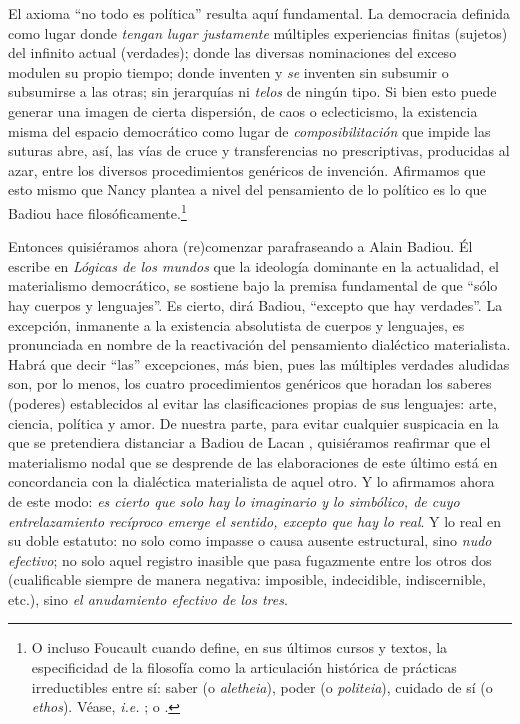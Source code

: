 El axioma \enquote{no todo es política} resulta aquí fundamental. La democracia definida como lugar donde \emph{tengan lugar justamente} múltiples experiencias finitas (sujetos) del infinito actual (verdades); donde las diversas nominaciones del exceso modulen su propio tiempo; donde inventen y \emph{se} inventen sin subsumir o subsumirse a las otras; sin jerarquías ni \emph{telos} de ningún tipo. Si bien esto puede generar una imagen de cierta dispersión, de caos o eclecticismo, la existencia misma del espacio democrático como lugar de \emph{composibilitación} que impide las suturas abre, así, las vías de cruce y transferencias no prescriptivas, producidas al azar, entre los diversos procedimientos genéricos de invención. Afirmamos que esto mismo que Nancy plantea a nivel del pensamiento de lo político  es lo que Badiou hace filosóficamente.\footnote{O incluso Foucault cuando define, en sus últimos cursos y textos, la especificidad de la filosofía como la articulación histórica de prácticas irreductibles entre sí: saber (o \textit{aletheia}), poder (o \textit{politeia}), cuidado de sí (o \textit{ethos}). Véase, \textit{i.e.} \cite{@7069-FOUCAULT2010}; o \cite{@7037-FOUCAULT2002}.}


Entonces quisiéramos ahora (re)comenzar  parafraseando a Alain Badiou. Él escribe en \emph{Lógicas de los mundos} que la ideología dominante en la actualidad, el materialismo democrático, se sostiene bajo la premisa fundamental de que \enquote{sólo hay cuerpos y lenguajes}. Es cierto, dirá Badiou, \enquote{excepto que hay verdades}. La excepción, inmanente a la existencia absolutista de cuerpos y lenguajes, es pronunciada en nombre de la reactivación del pensamiento dialéctico materialista. Habrá que decir \enquote{las} excepciones, más bien, pues las múltiples verdades aludidas son, por lo menos, los cuatro procedimientos genéricos que horadan los saberes (poderes) establecidos al evitar las clasificaciones propias de sus lenguajes: arte, ciencia, política y amor. De nuestra parte, para evitar cualquier suspicacia en la que se pretendiera distanciar a Badiou de Lacan , quisiéramos reafirmar que el materialismo nodal que se desprende de las elaboraciones de este último está en concordancia con la dialéctica materialista de aquel otro. Y lo afirmamos ahora de este modo: \emph{es cierto que solo hay lo imaginario y lo simbólico, de cuyo entrelazamiento recíproco emerge el sentido, excepto que hay lo real}. Y lo real en su doble estatuto: no solo como impasse o causa ausente estructural, sino \emph{nudo efectivo}; no solo aquel registro inasible que pasa fugazmente entre los otros dos (cualificable siempre de manera negativa: imposible, indecidible, indiscernible, etc.), sino \emph{el anudamiento efectivo de los tres}.

